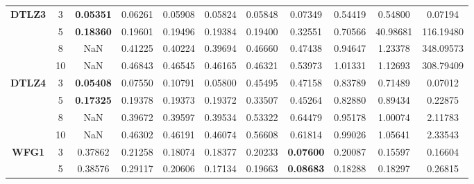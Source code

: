 \documentclass[conference]{IEEEtran}
\begin{document}
\begin{table*}[!htb]
\begin{tabular}{|c|c|c|c|c|c|c|c|c|c|c|}
		\multirow{4}{*}{\textbf{DTLZ3}} & 3          & \textbf{0.05351} & 0.06261           & 0.05908               & 0.05824          & 0.05848             & 0.07349             & 0.54419            & 0.54800              & 0.07194          \\ \cline{2-11} 
		& 5          & \textbf{0.18360} & 0.19601           & 0.19496               & 0.19384          & 0.19400             & 0.32551             & 0.70566            & 40.98681             & 116.19480        \\ \cline{2-11} 
		& 8          & NaN              & 0.41225           & 0.40224               & 0.39694          & 0.46660             & 0.47438             & 0.94647            & 1.23378              & 348.09573        \\ \cline{2-11} 
		& 10         & NaN              & 0.46843           & 0.46545               & 0.46165          & 0.46321             & 0.53973             & 1.01331            & 1.12693              & 308.79409        \\ \hline
		\multirow{4}{*}{\textbf{DTLZ4}} & 3          & \textbf{0.05408} & 0.07550           & 0.10791               & 0.05800          & 0.45495             & 0.47158             & 0.83789            & 0.71489              & 0.07012          \\ \cline{2-11} 
		& 5          & \textbf{0.17325} & 0.19378           & 0.19373               & 0.19372          & 0.33507             & 0.45264             & 0.82880            & 0.89434              & 0.22875          \\ \cline{2-11} 
		& 8          & NaN              & 0.39672           & 0.39597               & 0.39534          & 0.53322             & 0.64479             & 0.95178            & 1.00074              & 2.11783          \\ \cline{2-11} 
		& 10         & NaN              & 0.46302           & 0.46191               & 0.46074          & 0.56608             & 0.61814             & 0.99026            & 1.05641              & 2.33543          \\ \hline
		\multirow{4}{*}{\textbf{WFG1}}  & 3          & 0.37862          & 0.21258           & 0.18074               & 0.18377          & 0.20233             & \textbf{0.07600}    & 0.20087            & 0.15597              & 0.16604          \\ \cline{2-11} 
		& 5          & 0.38576          & 0.29117           & 0.20606               & 0.17134          & 0.19663             & \textbf{0.08683}    & 0.18288            & 0.18297              & 0.26815          \\ \cline{2-11} 

\end{tabular}
\end{table*}
\end{document}
